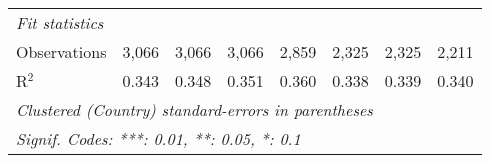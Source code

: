 \begin{tabular}{lccccccc}
   \midrule \emph{Fit statistics}\\
   Observations                                                                       & 3,066   & 3,066       & 3,066       & 2,859        & 2,325         & 2,325        & 2,211\\  
   R$^2$                                                                              & 0.343   & 0.348       & 0.351       & 0.360        & 0.338         & 0.339        & 0.340\\  
   \midrule
   \multicolumn{8}{l}{\emph{Clustered (Country) standard-errors in parentheses}}\\
   \multicolumn{8}{l}{\emph{Signif. Codes: ***: 0.01, **: 0.05, *: 0.1}}\\
\end{tabular}
\par\endgroup


